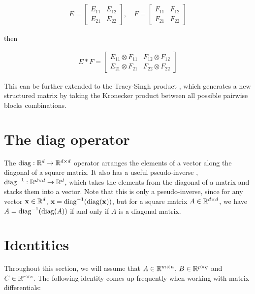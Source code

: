 \begin{align}
  E = \left[\begin{array}{c|c}
 E_{11} & E_{12} \\
 \hline
 E_{21} & E_{22}
 \end{array}\right], \quad
   F = \left[\begin{array}{c|c}
 F_{11} & F_{12} \\
 \hline
 F_{21} & F_{22}
 \end{array}\right]
\end{align}

then

\begin{align}
  E \ast F = \left[\begin{array}{c|c}
 E_{11} \otimes F_{11} & F_{12} \otimes F_{12} \\
 \hline
 E_{21} \otimes F_{21} & F_{22} \otimes F_{22}
 \end{array}\right]
\end{align}

This can be further extended to the Tracy-Singh product \cite{tracy1972new}, which generates a new structured matrix by taking the Kronecker product between all possible pairwise blocks combinations.

\section{The diag operator}

The $\operatorname{diag}: \mathbb{R}^d \to \mathbb{R}^{d \times d}$ operator arranges the elements of a vector along the diagonal of a square matrix.  It also has a useful pseudo-inverse \cite{minka2000old}, $\operatorname{diag}^{-1}: \mathbb{R}^{d \times d} \to \mathbb{R}^d$, which takes the elements from the diagonal of a matrix and stacks them into a vector.  Note that this is only a pseudo-inverse, since for any vector $\mathbf{x} \in \mathbb{R}^d$, $\mathbf{x} = \operatorname{diag}^{-1}(\operatorname{diag}(\mathbf{x}))$, but for a square matrix $A \in \mathbb{R}^{d \times d}$, we have $A = \operatorname{diag}^{-1}(\operatorname{diag}(A))$ if and only if $A$ is a diagonal matrix.

\section{Identities}

 Throughout this section, we will assume that $A \in \mathbb{R}^{m \times n}$, $B \in \mathbb{R}^{p \times q}$ and $C \in \mathbb{R}^{r\times s}$.  The following identity comes up frequently when working with matrix differentials:

